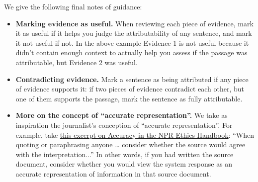 \documentclass[11pt]{article}
\begin{document}
We give the following final notes of guidance:
\begin{itemize}
\item  \textbf{Marking evidence as useful.} When reviewing each piece of evidence, mark it as useful if it helps you judge the attributability of any sentence, and mark it not useful if not. In the above example Evidence 1 is not useful because it didn't contain enough context to actually help you assess if the passage was attributable, but Evidence 2 was useful.
\item
\textbf{Contradicting evidence.} Mark a sentence as being attributed if any piece of evidence supports it: if two pieces of evidence contradict each other, but one of them supports the passage, mark the sentence as fully attributable.
\item
\textbf{More on the concept of ``accurate representation''.} We take as inspiration the journalist's conception of ``accurate representation''. For example, take \href{https://www.npr.org/about-npr/688139552/accuracy}{this excerpt on Accuracy in the NPR Ethics Handbook}: ``When quoting or paraphrasing anyone … consider whether the source would agree with the interpretation...'' In other words, if you had written the source document, consider whether you would view the system response as an accurate representation of information in that source document.
\end{itemize}
\end{document}
